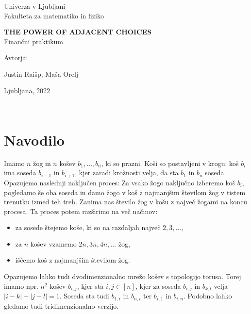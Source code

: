 \documentclass[a4paper, 11pt]{article}
\begin{document}
\thispagestyle{empty}
\begin{center}
\begin{minipage}{0.75\linewidth}
    \centering
    {\Large Univerza v Ljubljani \\ Fakulteta za matematiko in fiziko}
    \\
    \vspace{7cm}

    {\uppercase{\Large \textbf{The power of adjacent choices}}} \\ Finančni praktikum \\
    \vspace{3cm}

    Avtorja:\\
    {\Large Justin Raišp, Maša Orelj\par}
    \vspace{7cm}

    {\Large Ljubljana, 2022}
\end{minipage}
\end{center}

\newpage

\
\section{Navodilo}

Imamo $n$ žog in $n$ košev $b_1, \dots , b_n$, ki so prazni. Koši so postavljeni v krogu: koš $b_i$ ima soseda 
$b_{i-1}$ in $b_{i+1}$, kjer zaradi krožnosti velja, da sta $b_1$ in $b_n$ soseda.
Opazujemo naslednji naključen proces: Za vsako žogo naključno izberemo koš $b_i$, pogledamo še oba soseda in damo žogo 
v koš z najmanjšim številom žog v tistem trenutku izmed teh treh. Zanima nas število žog v košu z največ žogami na koncu procesa. 
Ta proces potem razširimo na več načinov:
\begin{itemize}
    \item za sosede štejemo koše, ki so na razdaljah največ $2, 3, \dots$,
    \item za $n$ košev vzamemo $2n, 3n, 4n, \dots$ žog,
    \item iščemo koš z najmanjšim številom žog.
\end{itemize}  
Opazujemo lahko tudi dvodimenzionalno mrežo košev s topologijo torusa. Torej imamo npr. $n^2$ košev $b_{i,j}$, kjer sta 
$i, j \in [n]$, kjer za soseda $b_{i,j}$ in $b_{k,l}$ velja $|i - k| + |j - l| = 1$. Soseda sta tudi
$b_{1,i}$ in $b_{n,i}$  ter $b_{i,1}$ in $b_{i,n}$. Podobno lahko gledamo tudi tridimenzionalno verzijo.
\end{document}
